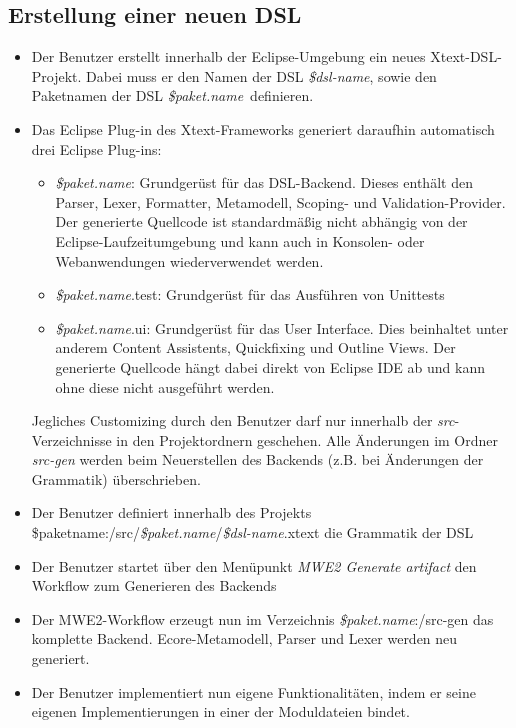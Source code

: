 \documentclass[a4paper,12pt]{scrreprt}
\begin{document}
\subsection{Erstellung einer neuen DSL}
\newcommand{\paketname}[0]{{\textit{\${paket.name}}}}
\newcommand{\dslname}[0]{{\textit{\${dsl-name}}}}
\begin{itemize}
	\item Der Benutzer erstellt innerhalb der Eclipse-Umgebung ein neues Xtext-DSL-Projekt.
	Dabei muss er den Namen der DSL \dslname, sowie den Paketnamen der DSL \paketname\ definieren.
	\item Das Eclipse Plug-in des Xtext-Frameworks generiert daraufhin automatisch drei Eclipse Plug-ins:
	\begin{itemize}
		\item \paketname: Grundgerüst für das DSL-Backend. Dieses enthält den Parser, Lexer, Formatter,  Metamodell, Scoping- und Validation-Provider. Der generierte Quellcode ist standardmäßig nicht abhängig von der Eclipse-Laufzeitumgebung und kann auch in Konsolen- oder Webanwendungen wiederverwendet werden.
		\item \paketname.test: Grundgerüst für das Ausführen von Unittests
		\item \paketname.ui: Grundgerüst für das User Interface. Dies beinhaltet unter anderem Content Assistents, Quickfixing und Outline Views. Der generierte Quellcode hängt dabei direkt von Eclipse IDE ab und kann ohne diese nicht ausgeführt werden.
	\end{itemize}
	Jegliches Customizing durch den Benutzer darf nur innerhalb der \textit{src}-Ver\-zeich\-nisse in den Projektordnern geschehen. Alle Änderungen im Ordner \textit{src-gen} werden beim Neuerstellen des Backends (z.B. bei Änderungen der Grammatik) überschrieben.
	\item Der Benutzer definiert innerhalb des Projekts \${paketname}:/src/\paketname/\dslname.xtext die Grammatik der DSL
	\item Der Benutzer startet über den Menüpunkt \textit{MWE2 Generate artifact} den Workflow zum Generieren des Backends
	\item Der MWE2-Workflow erzeugt nun im Verzeichnis \paketname:/src-gen das komplette Backend. Ecore-Metamodell, Parser und Lexer werden neu ge\-ne\-riert.
	\item Der Benutzer implementiert nun eigene Funktionalitäten, indem er seine eigenen Implementierungen in einer der Moduldateien bindet.
\end{itemize}
\end{document}
